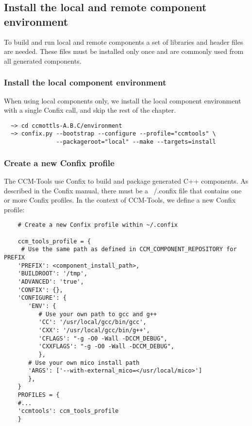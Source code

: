 
\subsection{Install the local and remote component environment}

To build and run local and remote components a set of libraries and header files
are needed. These files must be installed only once and are commonly used from all
generated components.

\subsubsection{Install the local component environment}
When using local components only, we install the local component environment with
a single Confix call, and skip the rest of the chapter. 
\begin{small}
\begin{verbatim}
  ~> cd ccmottls-A.B.C/environment
  ~> confix.py --bootstrap --configure --profile="ccmtools" \
               --packageroot="local" --make --targets=install
\end{verbatim}
\end{small}


\subsubsection{Create a new Confix profile}
The CCM-Tools use Confix to build and package generated C++ components. As described
in the Confix manual, there must be a ~/.confix file that contains one or more
Confix profiles. In the context of CCM-Tools, we define a new Confix profile:
\begin{small}
\begin{verbatim}
    # Create a new Confix profile within ~/.confix

    ccm_tools_profile = {
     # Use the same path as defined in CCM_COMPONENT_REPOSITORY for PREFIX 
    'PREFIX': <component_install_path>, 
    'BUILDROOT': '/tmp',
    'ADVANCED': 'true',
    'CONFIX': {},
    'CONFIGURE': {
       'ENV': {
          # Use your own path to gcc and g++
          'CC': '/usr/local/gcc/bin/gcc',
          'CXX': '/usr/local/gcc/bin/g++',
          'CFLAGS': "-g -O0 -Wall -DCCM_DEBUG",
          'CXXFLAGS': "-g -O0 -Wall -DCCM_DEBUG",
          },
       # Use your own mico install path
       'ARGS': ['--with-external_mico=</usr/local/mico>']
       },
    }
    PROFILES = {
    #...
    'ccmtools': ccm_tools_profile
    }
\end{verbatim}
\end{small}


